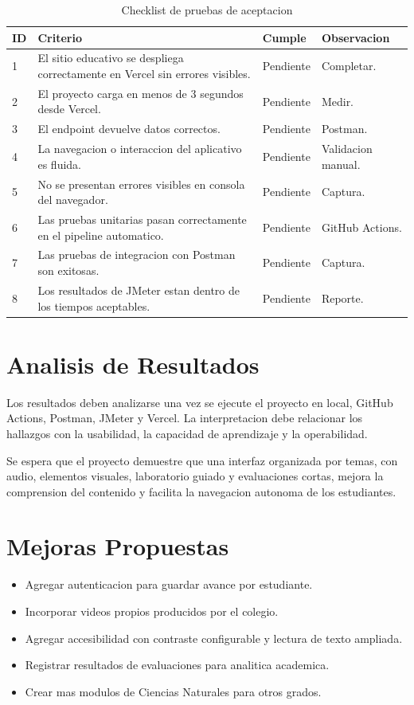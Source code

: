 \documentclass[man,12pt]{apa7}
\begin{document}
\begin{table}[H]
\centering
\caption{Checklist de pruebas de aceptacion}
\label{tab:aceptacion}
\begin{tabular}{p{0.9cm}p{8.2cm}p{1.6cm}p{2.3cm}}
\toprule
\textbf{ID} & \textbf{Criterio} & \textbf{Cumple} & \textbf{Observacion} \\
\midrule
1 & El sitio educativo se despliega correctamente en Vercel sin errores visibles. & Pendiente & Completar. \\
2 & El proyecto carga en menos de 3 segundos desde Vercel. & Pendiente & Medir. \\
3 & El endpoint devuelve datos correctos. & Pendiente & Postman. \\
4 & La navegacion o interaccion del aplicativo es fluida. & Pendiente & Validacion manual. \\
5 & No se presentan errores visibles en consola del navegador. & Pendiente & Captura. \\
6 & Las pruebas unitarias pasan correctamente en el pipeline automatico. & Pendiente & GitHub Actions. \\
7 & Las pruebas de integracion con Postman son exitosas. & Pendiente & Captura. \\
8 & Los resultados de JMeter estan dentro de los tiempos aceptables. & Pendiente & Reporte. \\
\bottomrule
\end{tabular}
\end{table}

\section{Analisis de Resultados}

Los resultados deben analizarse una vez se ejecute el proyecto en local, GitHub Actions, Postman, JMeter y Vercel. La interpretacion debe relacionar los hallazgos con la usabilidad, la capacidad de aprendizaje y la operabilidad.

Se espera que el proyecto demuestre que una interfaz organizada por temas, con audio, elementos visuales, laboratorio guiado y evaluaciones cortas, mejora la comprension del contenido y facilita la navegacion autonoma de los estudiantes.

\section{Mejoras Propuestas}

\begin{itemize}
  \item Agregar autenticacion para guardar avance por estudiante.
  \item Incorporar videos propios producidos por el colegio.
  \item Agregar accesibilidad con contraste configurable y lectura de texto ampliada.
  \item Registrar resultados de evaluaciones para analitica academica.
  \item Crear mas modulos de Ciencias Naturales para otros grados.
\end{itemize}
\end{document}
